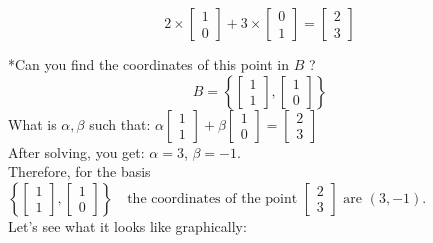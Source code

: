 \documentclass[12pt]{article}
\begin{document}
$$
2 \times \begin{bmatrix} 1 \\ 0 \end{bmatrix}
+ 3 \times \begin{bmatrix} 0 \\ 1 \end{bmatrix}
= \begin{bmatrix} 2 \\ 3 \end{bmatrix}
$$

*Can you find the coordinates of this point in $B$ ?  
$$
B = \left\{
\begin{bmatrix} 1 \\ 1 \end{bmatrix},
\begin{bmatrix} 1 \\ 0 \end{bmatrix}
\right\}
$$
What is $\alpha, \beta$ such that:
$
\alpha \begin{bmatrix} 1 \\ 1 \end{bmatrix}
+ \beta \begin{bmatrix} 1 \\ 0 \end{bmatrix}
= \begin{bmatrix} 2 \\ 3 \end{bmatrix}
$\\
\newline
After solving, you get: $\alpha = 3$, $\beta = -1$.\\
\newline
Therefore, for the basis 
$
\left\{
\begin{bmatrix} 1 \\ 1 \end{bmatrix},
\begin{bmatrix} 1 \\ 0 \end{bmatrix}
\right\}
\quad \text{the coordinates of the point } \begin{bmatrix} 2 \\ 3 \end{bmatrix} \text{ are } (3, -1).
$\\
\newline
Let's see what it looks like graphically:
\end{document}
